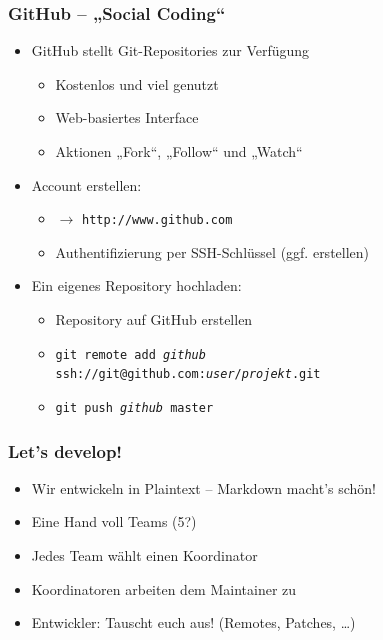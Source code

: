 \documentclass{beamer}
\begin{document}
\begin{frame}
 \frametitle{GitHub -- „Social Coding“}
  


\begin{itemize}
  \item GitHub stellt Git-Repositories zur Verfügung
\begin{itemize}
  \item Kostenlos und viel genutzt
  \item Web-basiertes Interface
  \item Aktionen „Fork“, „Follow“ und „Watch“
\end{itemize}
\end{itemize}

\begin{itemize}
  \item Account erstellen:
\begin{itemize}
  \item $\rightarrow$ \texttt{http://www.github.com}
  \item Authentifizierung per SSH-Schlüssel (ggf. erstellen)
\end{itemize}
\end{itemize}

\begin{itemize}
  \item Ein eigenes Repository hochladen:
\begin{itemize}
  \item Repository auf GitHub erstellen
  \item \texttt{git remote add \emph{github}}\\\qquad{}\texttt{ssh://git@github.com:\emph{user}/\emph{projekt}.git}
  \item \texttt{git push \emph{github} master}
\end{itemize}
\end{itemize}

  
 \end{frame}
\begin{frame}
 \frametitle{Let's develop!}
  


\begin{itemize}
  \item Wir entwickeln in Plaintext -- Markdown macht's schön!
\end{itemize}

\begin{itemize}
  \item Eine Hand voll Teams (5?)
  \item Jedes Team wählt einen Koordinator
  \item Koordinatoren arbeiten dem Maintainer zu
  \item Entwickler: Tauscht euch aus! (Remotes, Patches, \ldots{})
\end{itemize}

  
 \end{frame}
\end{document}
